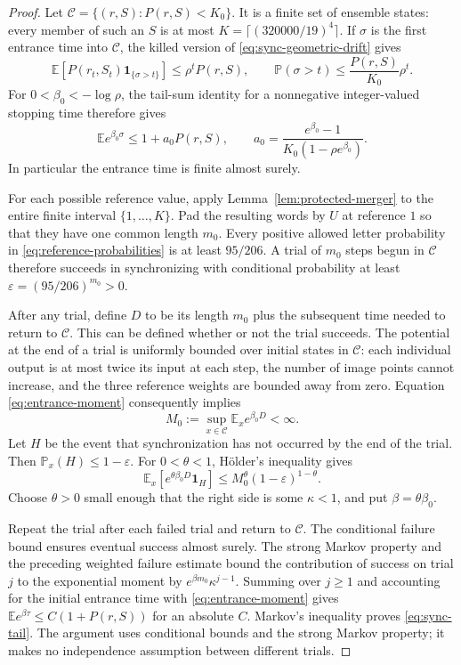 \begin{proof}
Let $\mathcal C=\{(r,S):P(r,S)<K_0\}$. It is a finite set of
ensemble states: every member of such an $S$ is at most
$K=\lceil(320000/19)^4\rceil$. If $\sigma$ is the first entrance
time into $\mathcal C$, the killed version of
\eqref{eq:sync-geometric-drift} gives
\[
 \mathbb E[P(r_t,S_t)\mathbf1_{\{\sigma>t\}}]
 \le\rho^t P(r,S),\qquad
 \mathbb P(\sigma>t)\le\frac{P(r,S)}{K_0}\rho^t.
\]
For $0<\beta_0<-\log\rho$, the tail-sum identity for a
nonnegative integer-valued stopping time therefore gives
\begin{equation}\label{eq:entrance-moment}
 \mathbb E e^{\beta_0\sigma}
 \le1+a_0P(r,S),\qquad
 a_0=\frac{e^{\beta_0}-1}{K_0(1-\rho e^{\beta_0})}.
\end{equation}
In particular the entrance time is finite almost surely.

For each possible reference value, apply
Lemma~\ref{lem:protected-merger} to the entire finite interval
$\{1,\ldots,K\}$. Pad the resulting words by $U$ at reference
$1$ so that they have one common length $m_0$. Every positive
allowed letter probability in \eqref{eq:reference-probabilities}
is at least $95/206$. A trial of $m_0$ steps begun in
$\mathcal C$ therefore succeeds in synchronizing with conditional
probability at least
$\varepsilon=(95/206)^{m_0}>0$.

After any trial, define $D$ to be its length $m_0$ plus the
subsequent time needed to return to $\mathcal C$. This can be
defined whether or not the trial succeeds. The potential at the
end of a trial is uniformly bounded over initial states in
$\mathcal C$: each individual output is at most twice its input
at each step, the number of image points cannot increase, and the
three reference weights are bounded away from zero. Equation
\eqref{eq:entrance-moment} consequently implies
\[
 M_0:=\sup_{x\in\mathcal C}\mathbb E_x e^{\beta_0D}<\infty.
\]
Let $H$ be the event that synchronization has not occurred by the
end of the trial. Then $\mathbb P_x(H)\le1-\varepsilon$.
For $0<\theta<1$, H\"older's inequality gives
\[
 \mathbb E_x[e^{\theta\beta_0D}\mathbf1_H]
 \le M_0^\theta(1-\varepsilon)^{1-\theta}.
\]
Choose $\theta>0$ small enough that the right side is some
$\kappa<1$, and put $\beta=\theta\beta_0$.

Repeat the trial after each failed trial and return to
$\mathcal C$. The conditional failure bound ensures eventual
success almost surely. The strong Markov property and the preceding
weighted failure estimate bound the contribution of success on
trial $j$ to the exponential moment by
$e^{\beta m_0}\kappa^{j-1}$. Summing over $j\ge1$ and accounting
for the initial entrance time with
\eqref{eq:entrance-moment} gives
$\mathbb E e^{\beta\tau}\le C(1+P(r,S))$ for an absolute
$C$. Markov's inequality proves \eqref{eq:sync-tail}.
The argument uses conditional bounds and the strong Markov property;
it makes no independence assumption between different trials.
\end{proof}

